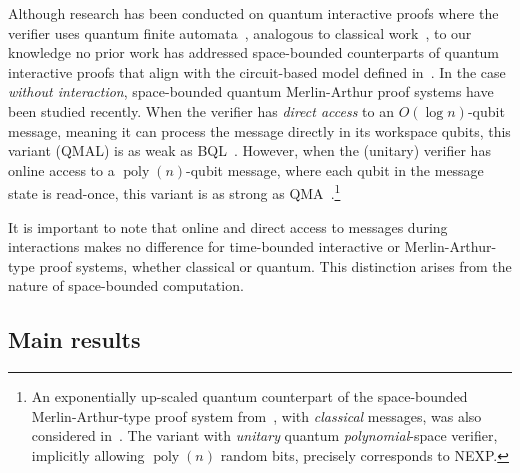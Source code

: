 \documentclass[10pt,a4paper]{article}
\numberwithin{equation}{section}
\numberwithin{figure}{section}
\newcommand{\NEXP}{\textnormal{\textsf{NEXP}}\xspace}
\newcommand{\QMA}{\textnormal{\textsf{QMA}}\xspace}
\newcommand{\QMAL}{\textnormal{\textsf{QMAL}}\xspace}
\newcommand{\BQL}{\textnormal{\textsf{BQL}}\xspace}
\DeclareMathOperator\poly{poly}
\begin{document}
Although research has been conducted on quantum interactive proofs where the verifier uses quantum finite automata~\cite{NY09,NY15,Yaka13}, analogous to classical work~\cite{DS89}, to our knowledge no prior work has addressed space-bounded counterparts of quantum interactive proofs that align with the circuit-based model defined in~\cite{KW00, Wat99QIP}. In the case \textit{without interaction}, space-bounded quantum Merlin-Arthur proof systems have been studied recently. When the verifier has \textit{direct access} to an $O(\log n)$-qubit message, meaning it can process the message directly in its workspace qubits, this variant (\QMAL{}) is as weak as \BQL{}~\cite{FKLMN16,FR21}. However, when the (unitary) verifier has online access to a $\poly(n)$-qubit message, where each qubit in the message state is read-once, this variant is as strong as \QMA{}~\cite{GR23online}.\footnote{An exponentially up-scaled quantum counterpart of the space-bounded Merlin-Arthur-type proof system from~\cite{Lipton90}, with \textit{classical} messages, was also considered in~\cite{GR23online}. The variant with \textit{unitary} quantum \textit{polynomial}-space verifier, implicitly allowing $\poly(n)$ random bits, precisely corresponds to \NEXP{}.\label{footref:streaming-proof}}

It is important to note that online and direct access to messages during interactions makes no difference for time-bounded interactive or Merlin-Arthur-type proof systems, whether classical or quantum. This distinction arises from the nature of space-bounded computation.

\subsection{Main results}
\end{document}
